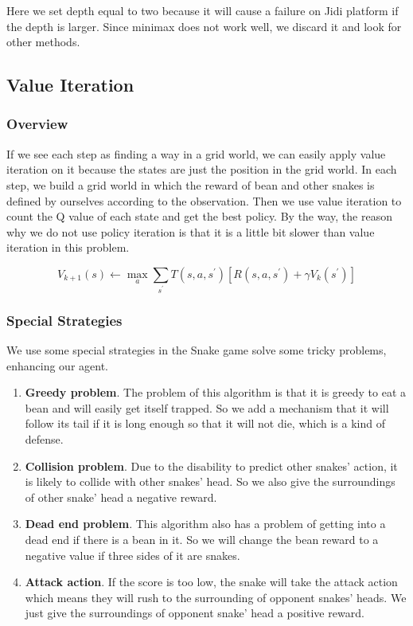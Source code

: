 \documentclass{article}
\begin{document}
Here we set depth equal to two because it will cause a failure on Jidi platform if the depth is larger. Since minimax does not work well, we discard it and look for other methods.

\subsection{Value Iteration}

\subsubsection{Overview}
If we see each step as finding a way in a grid world, we can easily apply value iteration on it because the states are just the position in the grid world. In each step, we build a grid world in which the reward of bean and other snakes is defined by ourselves according to the observation. Then we use value iteration to count the Q value of each state and get the best policy. By the way, the reason why we do not use policy iteration is that it is a little bit slower than value iteration in this problem.

$$
V_{k+1}(s) \leftarrow \max _{a} \sum_{s^{\prime}} T\left(s, a, s^{\prime}\right)\left[R\left(s, a, s^{\prime}\right)+\gamma V_{k}\left(s^{\prime}\right)\right]
$$

\subsubsection{Special Strategies}

We use some special strategies in the Snake game solve some tricky problems, enhancing our agent.

\begin{enumerate}
    \item \textbf{Greedy problem}. The problem of this algorithm is that it is greedy to eat a bean and will easily get itself trapped. So we add a mechanism that it will follow its tail if it is long enough so that it will not die, which is a kind of defense.
    \item \textbf{Collision problem}. Due to the disability to predict other snakes' action, it is likely to collide with other snakes' head. So we also give the surroundings of other snake' head a negative reward.
    \item \textbf{Dead end problem}. This algorithm also has a problem of getting into a dead end if there is a bean in it. So we will change the bean reward to a negative value if three sides of it are snakes.
    \item \textbf{Attack action}. If the score is too low, the snake will take the attack action which means they will rush to the surrounding of opponent snakes' heads. We just give the surroundings of opponent snake' head a positive reward.
\end{enumerate}
\end{document}
